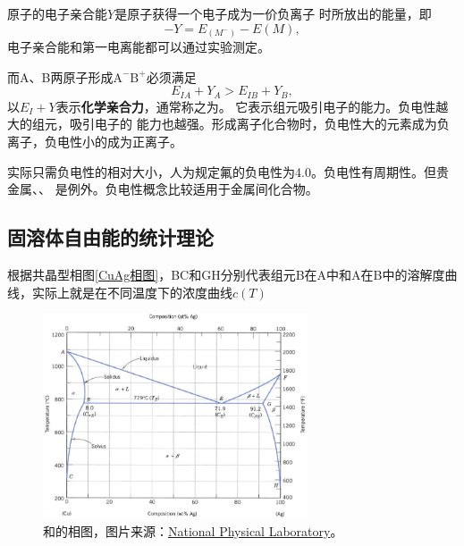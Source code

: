                 原子的电子亲合能$Y$是原子获得一个电子成为一价负离子
                时所放出的能量，即
                \begin{equation}
                    -Y=E_(M^-)-E(M),
                \end{equation}
                电子亲合能和第一电离能都可以通过实验测定。

                而A、B两原子形成$\mathrm{A}^{-}\mathrm{B}^{+}$必须满足
                \begin{equation}
                    E_{IA}+Y_{A}>E_{IB}+Y_{B},
                \end{equation}
                以$E_I+Y$表示\textbf{化学亲合力}，通常称之为。
                它表示组元吸引电子的能力。负电性越大的组元，吸引电子的
                能力也越强。形成离子化合物时，负电性大的元素成为负离子，负电性小的成为正离子。

                实际只需负电性的相对大小，人为规定氟的负电性为4.0。负电性有周期性。但贵金属、、
                是例外。负电性概念比较适用于金属间化合物。
        \subsection{固溶体自由能的统计理论}
            根据共晶型相图\autoref{CuAg相图}，BC和GH分别代表组元B在A中和A在B中的溶解度曲线，实际上就是在不同温度下的浓度曲线$c(T)$
            \begin{figure}[ht]
                \centering
                \includegraphics[width=0.7\textwidth]{fig/Cu_Ag_Phase_Diagram.png}
                \caption{和的相图，图片来源：\href{http://resource.npl.co.uk/mtdata/phdiagrams/agcu.htm}{National Physical Laboratory}。}
                \label{CuAg相图}
            \end{figure}

